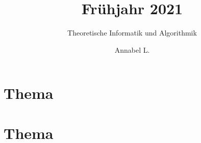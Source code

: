 \documentclass[stex]{ddifau}
\title{Frühjahr 2021}
\subtitle{Theoretische Informatik und Algorithmik}
\author{Annabel L.}
\begin{document}
\maketitle

\section{Thema}

\clearpage

\section{Thema}

\end{document}
